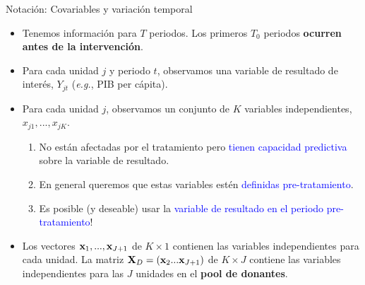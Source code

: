 \documentclass[10pt, xcolor=dvipsnames]{beamer}
\begin{document}
\begin{frame}{Notación: Covariables y variación temporal}
\begin{itemize}\setlength{\itemsep}{0.5em}
    \item Tenemos información para $T$ periodos. Los primeros $T_0$ periodos \textbf{ocurren antes de la intervención}.
    \item Para cada unidad $j$ y periodo $t$, observamos una variable de resultado de interés, $Y_{jt}$ (\textit{e.g.}, PIB per cápita).
    \item Para cada unidad $j$, observamos un conjunto de $K$ variables independientes, $x_{j1},...,x_{jK}$. %
    \vspace{0.3em}
    \begin{enumerate}
    \item No están afectadas por el tratamiento pero \textcolor{blue}{tienen capacidad predictiva} sobre la variable de resultado. %
    \item En general queremos que estas variables estén \textcolor{blue}{definidas pre-tratamiento}. %
    \item Es posible (y deseable) usar la \textcolor{blue}{variable de resultado en el periodo pre-tratamiento}!
    \end{enumerate} 
    \item Los vectores $\textbf{x}_1,...,\textbf{x}_{J+1}$ de $K \times 1$ contienen las variables independientes para cada unidad. La matriz $\textbf{X}_D = (\textbf{x}_2 ... \textbf{x}_{J+1})$ de $K\times J$ contiene las variables independientes para las $J$ unidades en el \textbf{pool de donantes}. 
\end{itemize}
\end{frame}
\end{document}
